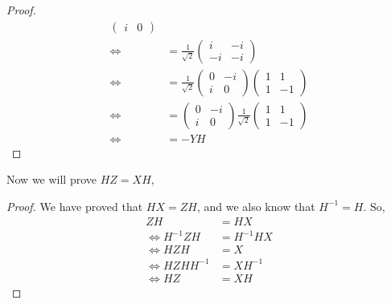 \documentclass[addpoints]{exam}
\begin{document}
\begin{questions}
\begin{solution}
\begin{proof}
\begin{align*}
\begin{pmatrix}
					                                                 i & 0
				                                                 \end{pmatrix} \\
				\iff \qquad & = \frac{1}{\sqrt{2}} \begin{pmatrix}
					                                   i  & -i \\
					                                   -i & -i
				                                   \end{pmatrix}               \\
				\iff \qquad & = \frac{1}{\sqrt{2}} \begin{pmatrix}
					                                   0 & -i \\
					                                   i & 0
				                                   \end{pmatrix} \begin{pmatrix}
					                                                 1 & 1  \\
					                                                 1 & -1
				                                                 \end{pmatrix} \\
				\iff \qquad & =  \begin{pmatrix}
					                 0 & -i \\
					                 i & 0
				                 \end{pmatrix} \frac{1}{\sqrt{2}}\begin{pmatrix}
					                                                 1 & 1  \\
					                                                 1 & -1
				                                                 \end{pmatrix} \\
				\iff \qquad & = -YH
			\end{align*}
		\end{proof}
		Now we will prove \(HZ=XH\),
		\begin{proof}
			We have proved that \(HX=ZH\), and we also know that \(H^{-1}=H\). So,
			\begin{align*}
				ZH              & = HX       \\
				\iff  H^{-1}ZH  & = H^{-1}HX \\
				\iff  HZH       & = X        \\
				\iff  HZHH^{-1} & = XH^{-1}  \\
				\iff  HZ        & = XH

\end{align*}
\end{proof}
\end{solution}
\end{questions}
\end{document}
